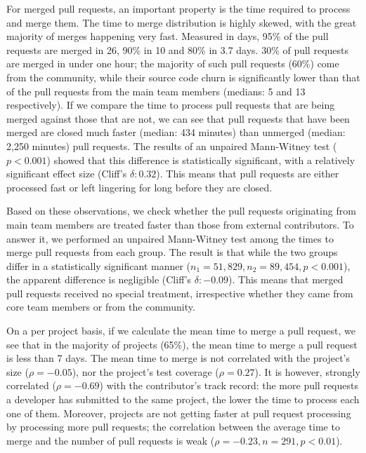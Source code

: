 \documentclass{sig-alternate}
\begin{document}
For merged pull requests, an important property is the time required to process
and merge them. The time to merge distribution is highly skewed, with the great
majority of merges happening very fast. Measured in days, 95\% of the pull
requests are merged in 26, 90\% in 10 and 80\% in 3.7 days. 30\% of pull
requests are merged in under one hour; the majority of such pull requests (60\%)
come from the community, while their source code churn is significantly lower
than that of the pull requests from the main team members (medians: 5 and 13
respectively). If we compare the time to process pull requests that are being
merged against those that are not, we can see that pull requests that have been
merged are closed much faster (median: 434 minutes) than unmerged (median: 2,250
minutes) pull requests.  The results of an unpaired Mann-Witney test ($p <
0.001$) showed that this difference is statistically significant, with a
relatively significant effect size (Cliff's $\delta: 0.32$). This means that
pull requests are either processed fast or left lingering for long before they
are closed.

Based on these observations, we check whether the pull
requests originating from main team members are treated faster than those from
external contributors. To answer it, we performed an unpaired Mann-Witney test
among the times to merge pull requests from each group. The result is that while
the two groups differ in a statistically significant manner ($n_1 = 51,829, n_2
= 89,454, p < 0.001$), the apparent difference is negligible (Cliff's $\delta:
-0.09$). This means that merged pull requests received no special treatment,
irrespective whether they came from core team members or from the community.

On a per project basis, if we calculate the mean time to merge a pull request,
we see that in the majority of projects (65\%), the mean time to merge a pull
request is less than 7 days. The mean time to merge is not correlated with the
project's size ($\rho = -0.05$), nor the project's test coverage ($\rho =
0.27$). It is however, strongly correlated ($\rho = -0.69$) with the contributor's
track record: the more pull requests a
developer has submitted to the same project, the lower the time to process each
one of them.
Moreover, projects are not getting faster at pull request processing by
processing more pull requests; the correlation between the average time to merge
and the number of pull requests is weak ($\rho = -0.23, n = 291, p < 0.01$).
\end{document}
